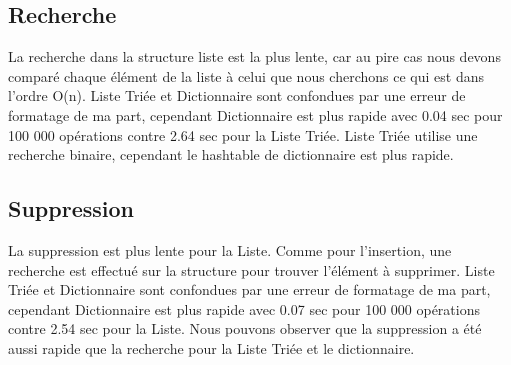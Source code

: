 \documentclass[11pt, french]{article} %
\begin{document}
\subsection{Recherche}
\begin{figure}[htbp]
\centering
{}
\end{figure}
La recherche dans la structure liste est la plus lente, car au pire cas nous devons comparé chaque élément de la liste à celui que nous cherchons ce qui est dans l'ordre O(n).
Liste Triée et Dictionnaire sont confondues par une erreur de formatage de ma part, cependant Dictionnaire est plus rapide avec 0.04 sec pour 100 000 opérations contre 2.64 sec pour la Liste Triée. Liste Triée utilise une recherche binaire, cependant le hashtable de dictionnaire est plus rapide.
\newline

\subsection{Suppression}
\begin{figure}[htbp]
\centering
{}
\end{figure}
La suppression est plus lente pour la Liste. Comme pour l'insertion, une recherche est effectué sur la structure pour trouver l'élément à supprimer. 
Liste Triée et Dictionnaire sont confondues par une erreur de formatage de ma part, cependant Dictionnaire est plus rapide avec 0.07 sec pour 100 000 opérations contre 2.54 sec pour la Liste.
Nous pouvons observer que la suppression a été aussi rapide que la recherche pour la Liste Triée et le dictionnaire.
\end{document}
